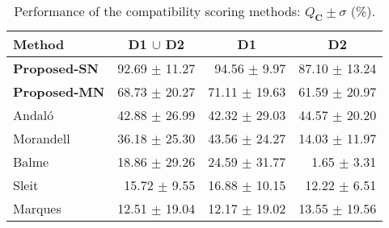 
\begin{table}[b]
   \centering
   \caption{Performance of the compatibility scoring methods: $Q_{\mathbf{C}} \pm \sigma$ (\%).}
   \label{tab:matrix}
   \begin{tabular}{lrrr}
   \toprule
      \textbf{Method} & \multicolumn{1}{c}{D1 $\cup$ D2} & \multicolumn{1}{c}{D1} & \multicolumn{1}{c}{D2}\\
      \midrule
      \textbf{Proposed-SN} & 92.69 $\pm$ 11.27 & 94.56 $\pm$ 9.97 & 87.10 $\pm$ 13.24\\
      \textbf{Proposed-MN} & 68.73 $\pm$ 20.27 & 71.11 $\pm$ 19.63 & 61.59 $\pm$ 20.97\\
      Andaló & 42.88 $\pm$ 26.99 & 42.32 $\pm$ 29.03 & 44.57 $\pm$ 20.20\\
      Morandell & 36.18 $\pm$ 25.30 & 43.56 $\pm$ 24.27 & 14.03 $\pm$ 11.97\\
      Balme & 18.86 $\pm$ 29.26 & 24.59 $\pm$ 31.77 & 1.65 $\pm$ 3.31\\
      Sleit & 15.72 $\pm$ 9.55 & 16.88 $\pm$ 10.15 & 12.22 $\pm$ 6.51\\
      Marques & 12.51 $\pm$ 19.04 & 12.17 $\pm$ 19.02 & 13.55 $\pm$ 19.56\\
      \bottomrule
   \end{tabular}
\end{table}
